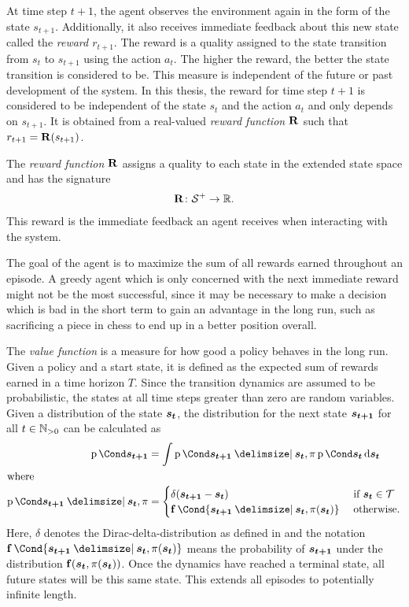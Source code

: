 At time step $t+1$, the agent observes the environment again in the form of the state $s_{t+1}$.
Additionally, it also receives immediate feedback about this new state called the \emph{reward $r_{t+1}$}.
The reward is a quality assigned to the state transition from $s_t$ to $s_{t+1}$ using the action $a_t$.
The higher the reward, the better the state transition is considered to be.
This measure is independent of the future or past development of the system.
In this thesis, the reward for time step $t+1$ is considered to be independent of the state $s_t$ and the action $a_t$ and only depends on $s_{t+1}$.
It is obtained from a real-valued \emph{reward function $\operatorname{\mathbf{R}}$} such that $r_{t+1} = \operatorname{\mathbf{R}}(s_{t+1})$.
\begin{definition}
    \label{def:reward_function}
    The \emph{reward function $\operatorname{\mathbf{R}}$} assigns a quality to each state in the extended state space and has the signature
    \begin{align}
        \operatorname{\mathbf{R}} \colon \mathcal{S}^+ \to \mathbb{R}.
    \end{align}
    This reward is the immediate feedback an agent receives when interacting with the system.
\end{definition}

The goal of the agent is to maximize the sum of all rewards earned throughout an episode.
A greedy agent which is only concerned with the next immediate reward might not be the most successful, since it may be necessary to make a decision which is bad in the short term to gain an advantage in the long run, such as sacrificing a piece in chess to end up in a better position overall.

The \emph{value function} is a measure for how good a policy behaves in the long run.
Given a policy and a start state, it is defined as the expected sum of rewards earned in a time horizon $T$.
Since the transition dynamics are assumed to be probabilistic, the states at all time steps greater than zero are random variables.
Given a distribution of the state $\bm{s_t}$, the distribution for the next state $\bm{s_{t+1}}$ for all $t \in \mathbb{N}_{>0}$ can be calculated as
\begin{align}
    \Prob{\rv{s_{t+1}}} &= \int \Prob{\rv{s_{t+1}} \given \rv{s_t}, \pi}\Prob{\rv{s_t}} \diff \rv{s_t} \\
    \intertext{where}
    \label{eq:rl_successive_state}
    \Prob{\rv{s_{t+1}} \given \rv{s_t}, \pi} &= \begin{cases}
        \delta(\rv{s_{t+1}} - \rv{s_t}) & \text{ if $\rv{s_t} \in \Tee$} \\
        \Dyn\Cond{\rv{s_{t+1}} \given \rv{s_t}, \pi(\rv{s_t})} & \text{ otherwise.}
    \end{cases}
\end{align}
Here, $\delta$ denotes the Dirac-delta-distribution as defined in \cite[39]{murphy_machine_2012} and the notation $\Dyn\Cond{\rv{s_{t+1}} \given \rv{s_t}, \pi(\rv{s_t})}$ means the probability of $\bm{s_{t+1}}$ under the distribution $\Dyn(\rv{s_t}, \pi(\rv{s_t}))$.
Once the dynamics have reached a terminal state, all future states will be this same state.
This extends all episodes to potentially infinite length.

